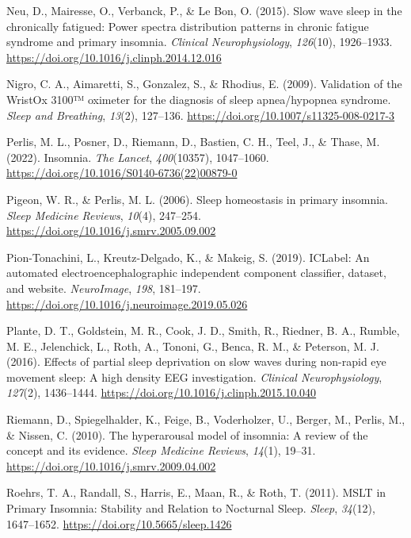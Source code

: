 \documentclass[
]{article}
\newlength{\cslhangindent}
\newenvironment{CSLReferences}[2] %
 {\begin{list}{}{%
  \setlength{\itemindent}{0pt}
  \setlength{\leftmargin}{0pt}
  \setlength{\parsep}{0pt}
  \ifodd #1
   \setlength{\leftmargin}{\cslhangindent}
   \setlength{\itemindent}{-1\cslhangindent}
  \fi
  \setlength{\itemsep}{#2\baselineskip}}}
 {\end{list}}
\begin{document}
\begin{CSLReferences}{1}{0}
Neu, D., Mairesse, O., Verbanck, P., \& Le Bon, O. (2015). Slow wave
sleep in the chronically fatigued: {Power} spectra distribution patterns
in chronic fatigue syndrome and primary insomnia. \emph{Clinical
Neurophysiology}, \emph{126}(10), 1926--1933.
\url{https://doi.org/10.1016/j.clinph.2014.12.016}

Nigro, C. A., Aimaretti, S., Gonzalez, S., \& Rhodius, E. (2009).
Validation of the {WristOx} 3100™ oximeter for the diagnosis of sleep
apnea/hypopnea syndrome. \emph{Sleep and Breathing}, \emph{13}(2),
127--136. \url{https://doi.org/10.1007/s11325-008-0217-3}

Perlis, M. L., Posner, D., Riemann, D., Bastien, C. H., Teel, J., \&
Thase, M. (2022). Insomnia. \emph{The Lancet}, \emph{400}(10357),
1047--1060. \url{https://doi.org/10.1016/S0140-6736(22)00879-0}

Pigeon, W. R., \& Perlis, M. L. (2006). Sleep homeostasis in primary
insomnia. \emph{Sleep Medicine Reviews}, \emph{10}(4), 247--254.
\url{https://doi.org/10.1016/j.smrv.2005.09.002}

Pion-Tonachini, L., Kreutz-Delgado, K., \& Makeig, S. (2019). {ICLabel}:
{An} automated electroencephalographic independent component classifier,
dataset, and website. \emph{NeuroImage}, \emph{198}, 181--197.
\url{https://doi.org/10.1016/j.neuroimage.2019.05.026}

Plante, D. T., Goldstein, M. R., Cook, J. D., Smith, R., Riedner, B. A.,
Rumble, M. E., Jelenchick, L., Roth, A., Tononi, G., Benca, R. M., \&
Peterson, M. J. (2016). Effects of partial sleep deprivation on slow
waves during non-rapid eye movement sleep: {A} high density {EEG}
investigation. \emph{Clinical Neurophysiology}, \emph{127}(2),
1436--1444. \url{https://doi.org/10.1016/j.clinph.2015.10.040}

Riemann, D., Spiegelhalder, K., Feige, B., Voderholzer, U., Berger, M.,
Perlis, M., \& Nissen, C. (2010). The hyperarousal model of insomnia:
{A} review of the concept and its evidence. \emph{Sleep Medicine
Reviews}, \emph{14}(1), 19--31.
\url{https://doi.org/10.1016/j.smrv.2009.04.002}

Roehrs, T. A., Randall, S., Harris, E., Maan, R., \& Roth, T. (2011).
{MSLT} in {Primary Insomnia}: {Stability} and {Relation} to {Nocturnal
Sleep}. \emph{Sleep}, \emph{34}(12), 1647--1652.
\url{https://doi.org/10.5665/sleep.1426}


\end{CSLReferences}
\end{document}
